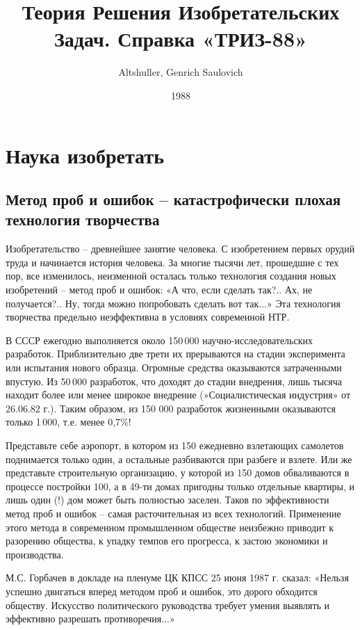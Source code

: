 \documentclass[11pt,a4paper]{article}
\title{Теория Решения Изобретательских Задач. Справка «ТРИЗ-88»}
\author{Altshuller, Genrich Saulovich}
\date{1988}
\begin{document}
\maketitle
\tableofcontents

\section{Наука изобретать}

\subsection{Метод проб и ошибок -- катастрофически плохая технология
  творчества} 

Изобретательство -- древнейшее занятие человека. С изобретением первых орудий
труда и начинается история человека. За многие тысячи лет, прошедшие с тех
пор, все изменилось, неизменной осталась только технология создания новых
изобретений -- метод проб и ошибок: «А что, если сделать так?.. Ах, не
получается?.. Ну, тогда можно попробовать сделать вот так...» Эта технология
творчества предельно неэффективна в условиях современной НТР.

В СССР ежегодно выполняется около 150\,000 научно-исследовательских
разработок.  Приблизительно две трети их прерываются на стадии эксперимента
или испытания нового образца. Огромные средства оказываются затраченными
впустую.  Из 50\,000 разработок, что доходят до стадии внедрения, лишь тысяча
находит более или менее широкое внедрение (»Социалистическая индустрия» от
26.06.82 г.). Таким образом, из 150 000 разработок жизненными оказываются
только 1\,000, т.е. менее 0,7\%!

Представьте себе аэропорт, в котором из 150 ежедневно взлетающих самолетов
поднимается только один, а остальные разбиваются при разбеге и взлете. Или же
представьте строительную организацию, у которой из 150 домов обваливаются в
процессе постройки 100, а в 49-ти домах пригодны только отдельные квартиры, и
лишь один (!) дом может быть полностью заселен. Таков по эффективности метод
проб и ошибок -- самая расточительная из всех технологий. Применение этого
метода в современном промышленном обществе неизбежно приводит к разорению
общества, к упадку темпов его прогресса, к застою экономики и производства.

М.С. Горбачев в докладе на пленуме ЦК КПСС 25 июня 1987 г. сказал: «Нельзя
успешно двигаться вперед методом проб и ошибок, это дорого обходится обществу.
Искусство политического руководства требует умения выявлять и эффективно
разрешать противоречия...»
\end{document}
